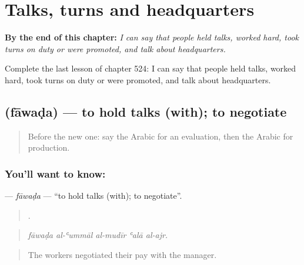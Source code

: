 
\chapter{Talks, turns and headquarters}
\label{ch:ar-talks-turns-and-headquarters}

\begin{chapteropening}
\textbf{By the end of this chapter:} \emph{I can say that people held talks, worked hard, took turns on duty or were promoted, and talk about headquarters.}

Complete the last lesson of chapter 524: I can say that people held talks, worked hard, took turns on duty or were promoted, and talk about headquarters.
\end{chapteropening}

\section[\texorpdfstring{\ar{فاوض} (fāwaḍa)}{فاوض (fāwaḍa)}]{ (fāwaḍa) — to hold talks (with); to negotiate}

\label{lesson:AR-C524-fawada}



\begin{quote}
Before the new one: say the Arabic for an evaluation, then the Arabic for production.
\end{quote}

\subsection*{You'll want to know: }
\textbf{} — \emph{fāwaḍa} — \textquotedblleft{}to hold talks (with); to negotiate\textquotedblright{}.

\begin{quote}
    .
\end{quote}

\begin{quote}
\emph{fāwaḍa al-ʿummāl al-mudīr ʿalā al-ajr.}
\end{quote}

\begin{quote}
The workers negotiated their pay with the manager.
\end{quote}

